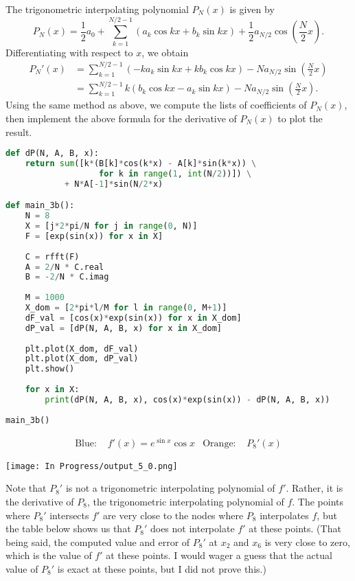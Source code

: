 \documentclass[12pt]{article}
\newcommand{\<}{\left\langle}
\renewcommand{\>}{\right\rangle}
\begin{document}
\newpage

The trigonometric interpolating polynomial $P_N(x)$ is given by
\[
    P_N(x) = \frac12 a_0 + \sum_{k=1}^{N/2-1} (a_k \cos kx + b_k \sin kx) + \frac12 a_{N/2} \cos \left( \frac{N}{2} x \right).
\]
Differentiating with respect to $x$, we obtain
\begin{align*}
    P_N'(x)
        &= \sum_{k=1}^{N/2-1} (-k a_k \sin kx + k b_k \cos kx) - N a_{N/2} \sin \left( \frac{N}{2} x \right) \\
        &= \sum_{k=1}^{N/2-1} k(b_k \cos kx - a_k \sin kx) - N a_{N/2} \sin \left( \frac{N}{2} x \right).
\end{align*}
Using the same method as above, we compute the lists of coefficients of $P_N(x)$, then implement the above formula for the derivative of $P_N(x)$ to plot the result.
\begin{lstlisting}[language=Python]
def dP(N, A, B, x):
    return sum([k*(B[k]*cos(k*x) - A[k]*sin(k*x)) \
                   for k in range(1, int(N/2))]) \
            + N*A[-1]*sin(N/2*x)

def main_3b():
    N = 8
    X = [j*2*pi/N for j in range(0, N)]
    F = [exp(sin(x)) for x in X]
    
    C = rfft(F)
    A = 2/N * C.real
    B = -2/N * C.imag
    
    M = 1000
    X_dom = [2*pi*l/M for l in range(0, M+1)]
    dF_val = [cos(x)*exp(sin(x)) for x in X_dom]
    dP_val = [dP(N, A, B, x) for x in X_dom]
    
    plt.plot(X_dom, dF_val)
    plt.plot(X_dom, dP_val)
    plt.show()
    
    for x in X:
        print(dP(N, A, B, x), cos(x)*exp(sin(x)) - dP(N, A, B, x))
    
main_3b()
\end{lstlisting}

\newpage

\begin{align*}
    \text{Blue: } & f'(x) = e^{\sin x}\cos x & \text{Orange: } & P_8'(x)
\end{align*}
\begin{center}
    \texttt{[image: In Progress/output\_5\_0.png]}
\end{center}

Note that $P_8'$ is not a trigonometric interpolating polynomial of $f'$. Rather, it is the derivative of $P_8$, the trigonometric interpolating polynomial of $f$. The points where $P_8'$ intersects $f'$ are very close to the nodes where $P_8$ interpolates $f$, but the table below shows us that $P_8'$ does not interpolate $f'$ at these points. (That being said, the computed value and error of $P_8'$ at $x_2$ and $x_6$ is very close to zero, which is the value of $f'$ at these points. I would wager a guess that the actual value of $P_8'$ is exact at these points, but I did not prove this.)
\end{document}
